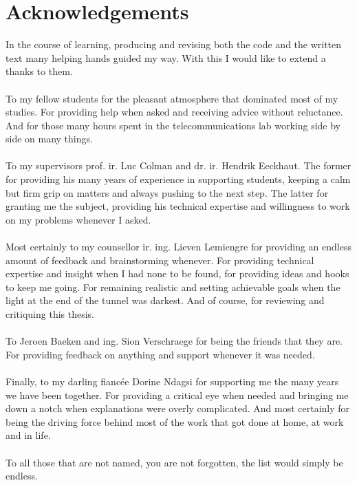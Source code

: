 \documentclass[11pt,british]{article}
\begin{document}
\section*{Acknowledgements}
In the course of learning, producing and revising both the code and the written text many helping hands guided my way. With this I would like to extend a thanks to them.
\\
\\
To my fellow students for the pleasant atmosphere that dominated most of my studies. For providing help when asked and receiving advice without reluctance. And for those many hours spent in the telecommunications lab working side by side on many things.
\\
\\
To my supervisors prof. ir. Luc Colman and dr. ir. Hendrik Eeckhaut. The former for providing his many years of experience in supporting students, keeping a calm but firm grip on matters and always pushing to the next step. The latter for granting me the subject, providing his technical expertise and willingness to work on my problems whenever I asked.
\\
\\
Most certainly to my counsellor ir. ing. Lieven Lemiengre for providing an endless amount of feedback and brainstorming whenever. For providing technical expertise and insight when I had none to be found, for providing ideas and hooks to keep me going. For remaining realistic and setting achievable goals when the light at the end of the tunnel was darkest. And of course, for reviewing and critiquing this thesis.
\\
\\
To Jeroen Baeken and ing. Sion Verschraege for being the friends that they are. For providing feedback on anything and support whenever it was needed.
\\
\\
Finally, to my darling fianc\'{e}e Dorine Ndagsi for supporting me the many years we have been together. For providing a critical eye when needed and bringing me down a notch when explanations were overly complicated. And most certainly for being the driving force behind most of the work that got done at home, at work and in life.
\\
\\
To all those that are not named, you are not forgotten, the list would simply be endless.

\pagebreak{}

\end{document}
